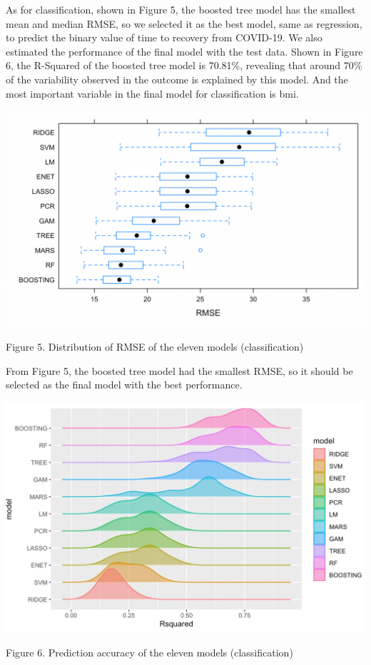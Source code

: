\documentclass[
]{article}
\begin{document}
As for classification, shown in Figure 5, the boosted tree model has the
smallest mean and median RMSE, so we selected it as the best model, same
as regression, to predict the binary value of time to recovery from
COVID-19. We also estimated the performance of the final model with the
test data. Shown in Figure 6, the R-Squared of the boosted tree model is
70.81\%, revealing that around 70\% of the variability observed in the
outcome is explained by this model. And the most important variable in
the final model for classification is bmi.

\begin{center}\includegraphics[width=0.9\linewidth,height=0.7\textheight]{secondary_analysis_plot/resample} \end{center}
\begin{center}
Figure 5. Distribution of RMSE of the eleven models (classification)
\end{center}

From Figure 5, the boosted tree model had the smallest RMSE, so it
should be selected as the final model with the best performance.

\begin{center}\includegraphics[width=0.9\linewidth,height=0.7\textheight]{secondary_analysis_plot/accuracy} \end{center}
\begin{center}
Figure 6. Prediction accuracy of the eleven models (classification)
\end{center}
\end{document}
